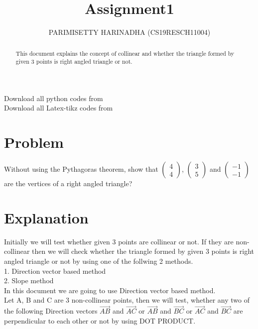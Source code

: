 \documentclass[journal,12pt,twocolumn]{IEEEtran}
\title{ Assignment1}
\author{PARIMISETTY HARINADHA (CS19RESCH11004)}
\newcommand{\myvec}[1]{\ensuremath{\begin{pmatrix}#1\end{pmatrix}}}
\begin{document}
\maketitle
\newpage
\begin{abstract}
This document explains the concept of collinear and whether the triangle formed by given 3 points is right angled triangle or not.
\end{abstract}
Download all python codes from 
 \\
\newline
Download all Latex-tikz codes from 
\section{Problem}
Without using the Pythagoras theorem, show that \myvec{ 4 \\ 4 }, \myvec{ 3 \\ 5 } and \myvec{ -1 \\ -1 } are the vertices of a right angled triangle?
\section{Explanation}
Initially we will test whether given 3 points are collinear or not. If they are non-collinear then we will check whether the triangle formed by given 3 points is right angled triangle or not by using one of the follwing 2 methods. \\
1. Direction vector based method\\
2. Slope method\\
In this document we are going to use Direction vector based method.\\
	Let A, B and C are 3 non-collinear points, then we will test, whether any two of the following Direction vectors $\vec{AB}$ and $\vec{AC}$ or $\vec{AB}$ and $\vec{BC}$ or $\vec{AC}$ and $\vec{BC}$ are perpendicular to each other or not by using DOT PRODUCT.
\\
\end{document}
